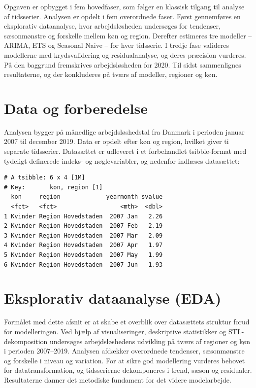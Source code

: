 \documentclass[
]{article}
\begin{document}
Opgaven er opbygget i fem hovedfaser, som følger en klassisk tilgang til
analyse af tidsserier. Analysen er opdelt i fem overordnede faser. Først
gennemføres en eksplorativ dataanalyse, hvor arbejdsløsheden undersøges
for tendenser, sæsonmønstre og forskelle mellem køn og region. Derefter
estimeres tre modeller -- ARIMA, ETS og Seasonal Naive -- for hver
tidsserie. I tredje fase valideres modellerne med krydsvalidering og
residualanalyse, og deres præcision vurderes. På den baggrund
fremskrives arbejdsløsheden for 2020. Til sidst sammenlignes
resultaterne, og der konkluderes på tværs af modeller, regioner og køn.

\section{Data og forberedelse}\label{data-og-forberedelse}

Analysen bygger på månedlige arbejdsløshedstal fra Danmark i perioden
januar 2007 til december 2019. Data er opdelt efter køn og region,
hvilket giver ti separate tidsserier. Datasættet er udleveret i et
forbehandlet tsibble-format med tydeligt definerede indeks- og
nøglevariabler, og nedenfor indlæses datasættet:

\begin{verbatim}
# A tsibble: 6 x 4 [1M]
# Key:       kon, region [1]
  kon     region             yearmonth svalue
  <fct>   <fct>                  <mth>  <dbl>
1 Kvinder Region Hovedstaden  2007 Jan   2.26
2 Kvinder Region Hovedstaden  2007 Feb   2.19
3 Kvinder Region Hovedstaden  2007 Mar   2.09
4 Kvinder Region Hovedstaden  2007 Apr   1.97
5 Kvinder Region Hovedstaden  2007 May   1.99
6 Kvinder Region Hovedstaden  2007 Jun   1.93
\end{verbatim}

\section{Eksplorativ dataanalyse
(EDA)}\label{eksplorativ-dataanalyse-eda}

Formålet med dette afsnit er at skabe et overblik over datasættets
struktur forud for modelleringen. Ved hjælp af visualiseringer,
deskriptive statistikker og STL-dekomposition undersøges
arbejdsløshedens udvikling på tværs af regioner og køn i perioden
2007--2019. Analysen afdækker overordnede tendenser, sæsonmønstre og
forskelle i niveau og variation. For at sikre god modellering vurderes
behovet for datatransformation, og tidsserierne dekomponeres i trend,
sæson og residualer. Resultaterne danner det metodiske fundament for det
videre modelarbejde.
\end{document}
